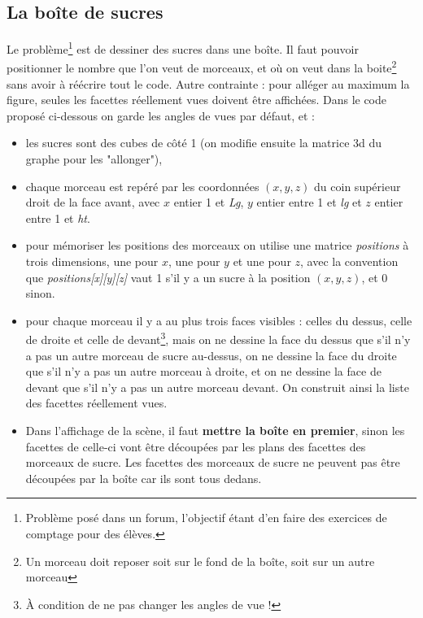 \subsection{La boîte de sucres}

Le problème\footnote{Problème posé dans un forum, l'objectif étant d'en faire des exercices de comptage pour des élèves.} est de dessiner des sucres dans une boîte. Il faut pouvoir positionner le nombre que l'on veut de morceaux, et où on veut dans la boite\footnote{Un morceau doit reposer soit sur le fond de la boîte, soit sur un autre morceau} sans avoir à réécrire tout le code. Autre contrainte : pour alléger au maximum la figure, seules les facettes réellement vues doivent être affichées. Dans le code proposé ci-dessous on garde les angles de vues par défaut, et :
\begin{itemize}
    \item les sucres sont des cubes de côté 1 (on modifie ensuite la matrice 3d du graphe pour les "allonger"),
    \item chaque morceau est repéré par les coordonnées $(x,y,z)$ du coin supérieur droit de la face avant, avec $x$ entier 1 et \emph{Lg}, $y$ entier entre 1 et \emph{lg} et $z$ entier entre 1 et \emph{ht}.
    \item pour mémoriser les positions des morceaux on utilise une matrice \emph{positions} à trois dimensions, une pour $x$, une pour $y$ et une pour $z$, avec la convention que \emph{positions[x][y][z]} vaut 1 s'il y a un sucre à la position $(x,y,z)$, et 0 sinon.
    \item pour chaque morceau il y a au plus trois faces visibles : celles du dessus, celle de droite et celle de devant\footnote{À condition de ne pas changer les angles de vue !}, mais on ne dessine la face du dessus que s'il n'y a pas un autre morceau de sucre au-dessus, on ne dessine la face du droite que s'il n'y a pas un autre morceau à droite, et on ne dessine la face de devant que s'il n'y a pas un autre morceau devant. On construit ainsi la liste des facettes réellement vues.
    \item Dans l'affichage de la scène, il faut \textbf{mettre la boîte en premier}, sinon les facettes de celle-ci vont être découpées par les plans des facettes des morceaux de sucre. Les facettes des morceaux de sucre ne peuvent pas être découpées par la boîte car ils sont tous dedans.
\end{itemize}

